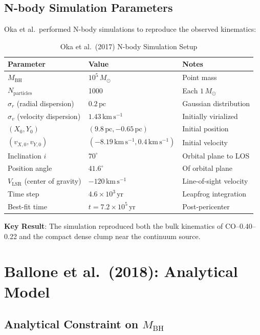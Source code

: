 \documentclass[11pt,a4paper]{article}
\newcommand{\Msun}{M_\odot}
\newcommand{\kms}{\,\mathrm{km\,s^{-1}}}
\newcommand{\pc}{\,\mathrm{pc}}
\begin{document}
\subsection{N-body Simulation Parameters}

Oka et al.~performed N-body simulations to reproduce the observed kinematics:

\begin{table}[h]
\centering
\caption{Oka et al.~(2017) N-body Simulation Setup}
\begin{tabular}{lll}
\toprule
\textbf{Parameter} & \textbf{Value} & \textbf{Notes} \\
\midrule
$M_\mathrm{BH}$ & $10^5\,\Msun$ & Point mass \\
$N_\mathrm{particles}$ & 1000 & Each $1\,\Msun$ \\
$\sigma_r$ (radial dispersion) & $0.2\pc$ & Gaussian distribution \\
$\sigma_v$ (velocity dispersion) & $1.43\kms$ & Initially virialized \\
$(X_0, Y_0)$ & $(9.8\pc, -0.65\pc)$ & Initial position \\
$(v_{X,0}, v_{Y,0})$ & $(-8.19\kms, 0.4\kms)$ & Initial velocity \\
Inclination $i$ & $70^\circ$ & Orbital plane to LOS \\
Position angle & $41.6^\circ$ & Of orbital plane \\
$V_\mathrm{LSR}$ (center of gravity) & $-120\kms$ & Line-of-sight velocity \\
Time step & $4.6 \times 10^3\,\mathrm{yr}$ & Leapfrog integration \\
Best-fit time & $t = 7.2 \times 10^5\,\mathrm{yr}$ & Post-pericenter \\
\bottomrule
\end{tabular}
\end{table}

\textbf{Key Result}: The simulation reproduced both the bulk kinematics of CO--0.40--0.22 and the compact dense clump near the continuum source.

\section{Ballone et al.~(2018): Analytical Model}

\subsection{Analytical Constraint on $M_\mathrm{BH}$}
\end{document}
